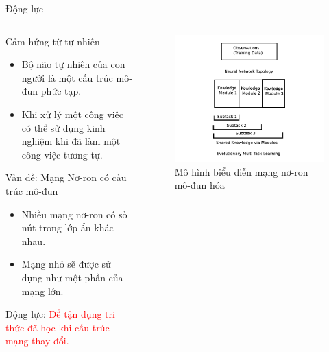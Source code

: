 	\begin{frame}{Động lực}
	    \begin{columns}
		\begin{itemize}
		    \begin{block}{Cảm hứng từ tự nhiên}
		        \begin{itemize}
		            \item Bộ não tự nhiên của con người là một cấu trúc mô-đun phức tạp.
		            \item Khi xử lý một công việc có thể sử dụng kinh nghiệm khi đã làm một công việc tương tự.
		        \end{itemize}
		    \end{block}\pause
		    \begin{block}{Vấn đề: Mạng Nơ-ron có cấu trúc mô-đun}
		        \begin{itemize}
		            \item Nhiều mạng nơ-ron có số nút trong lớp ẩn khác nhau. 
		            \item Mạng nhỏ sẽ được sử dụng như một phần của mạng lớn.
		        \end{itemize}
		        Động lực: \textcolor{red}{Để tận dụng tri thức đã học khi cấu trúc mạng thay đổi.}
		    \end{block}
		\end{itemize}
		\begin{figure}[ht]
            \centering
            \includegraphics[width=1.2\linewidth]{images/modular.png}
            \caption{Mô hình biểu diễn mạng nơ-ron mô-đun hóa}
            \label{fig:problem:modular}
        \end{figure}
		\end{columns}
	\end{frame}
	
